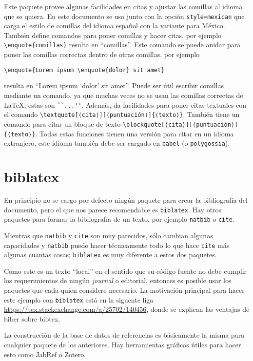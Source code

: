Este paquete provee algunas facilidades en citas y ajustar las
comillas al idioma que se quiera. En este documento se uso junto con la
opción \texttt{style=mexican} que carga el estilo de comillas del idioma
español con la variante para México. También define comandos para poner
comillas y hacer citas, por ejemplo \verb|\enquote{comillas}| resulta en
\enquote{comillas}. Este comando se puede anidar para poner las comillas
correctas dentro de otras comillas, por ejemplo
\begin{flushleft}
  \verb|\enquote{Lorem ipsum \enquote{dolor} sit amet}|
\end{flushleft}
resulta en \enquote{Lorem ipsum \enquote{dolor} sit amet}. Puede ser útil
escribir comillas mediante un comando, ya que muchas veces no se usan las
comillas correctas de \LaTeX, estas son \verb|``...''|. Además, da
facilidades para poner citas textuales con el comando
\verb|\textquote[⟨cita⟩][⟨puntuación⟩]{⟨texto⟩}|. También tiene un comando
para citar un bloque de texto
\verb|\blockquote[⟨cita⟩][⟨puntuación⟩]{⟨texto⟩}|. Todas estas funciones
tienen una versión para citar en un idioma extranjero, este idioma también
debe ser cargado en \texttt{babel} (o \texttt{polygossia}).


\section{biblatex}%
\label{sec:bib}
En principio no se cargo por defecto ningún paquete para crear la
bibliografía del documento, pero el que nos parece recomendable es
\texttt{biblatex}. Hay otros paquetes para formar la bibliografía de un
texto, por ejemplo \texttt{natbib} o \texttt{cite}.

Mientras que \texttt{natbib} y \texttt{cite} son muy parecidos, sólo cambian
algunas capacidades y \texttt{natbib} puede hacer técnicamente todo lo que
hace \texttt{cite} más algunas cuantas cosas; \texttt{biblatex} es muy
diferente a estos dos paquetes.

Como este es un texto \enquote{local} en el sentido que su código fuente no
debe cumplir los requerimientos de ningún \textit{journal} o editorial,
entonces es posible usar los paquetes que cada quien considere necesario. La
motivación principal para hacer este ejemplo con \texttt{biblatex} está
en la siguente liga \url{https://tex.stackexchange.com/a/25702/140456},
donde se explican las ventajas de biber sobre bibtex.

La construcción de la base de datos de referencias es básicamente la misma
para cualquier paquete de los anteriores. Hay herramientas gráficas útiles
para hacer esto como JabRef o Zotero.

